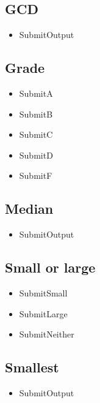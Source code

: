 \documentclass[
]{book}
\providecommand{\tightlist}{%
  \setlength{\itemsep}{0pt}\setlength{\parskip}{0pt}}
\begin{document}
\hypertarget{gcd}{%
\subsection{GCD}\label{gcd}}

\begin{itemize}
\tightlist
\item
  SubmitOutput
\end{itemize}

\hypertarget{grade}{%
\subsection{Grade}\label{grade}}

\begin{itemize}
\tightlist
\item
  SubmitA
\item
  SubmitB
\item
  SubmitC
\item
  SubmitD
\item
  SubmitF
\end{itemize}

\hypertarget{median}{%
\subsection{Median}\label{median}}

\begin{itemize}
\tightlist
\item
  SubmitOutput
\end{itemize}

\hypertarget{small-or-large}{%
\subsection{Small or large}\label{small-or-large}}

\begin{itemize}
\tightlist
\item
  SubmitSmall
\item
  SubmitLarge
\item
  SubmitNeither
\end{itemize}

\hypertarget{smallest}{%
\subsection{Smallest}\label{smallest}}

\begin{itemize}
\tightlist
\item
  SubmitOutput
\end{itemize}
\end{document}
